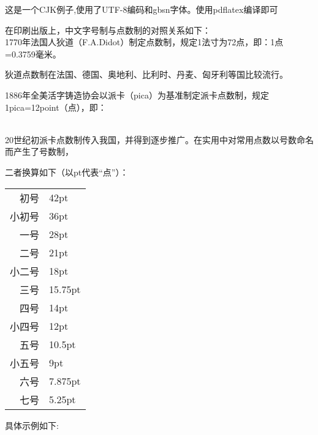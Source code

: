 \documentclass{article}
\newcommand{\chuhao}{\fontsize{42pt}{\baselineskip}\selectfont}
\newcommand{\xiaochuhao}{\fontsize{36pt}{\baselineskip}\selectfont}
\newcommand{\yihao}{\fontsize{28pt}{\baselineskip}\selectfont}
\newcommand{\erhao}{\fontsize{21pt}{\baselineskip}\selectfont}
\newcommand{\xiaoerhao}{\fontsize{18pt}{\baselineskip}\selectfont}
\newcommand{\sanhao}{\fontsize{15.75pt}{\baselineskip}\selectfont}
\newcommand{\sihao}{\fontsize{14pt}{\baselineskip}\selectfont}
\newcommand{\xiaosihao}{\fontsize{12pt}{\baselineskip}\selectfont}
\newcommand{\wuhao}{\fontsize{10.5pt}{\baselineskip}\selectfont}
\newcommand{\xiaowuhao}{\fontsize{9pt}{\baselineskip}\selectfont}
\newcommand{\liuhao}{\fontsize{7.875pt}{\baselineskip}\selectfont}
\newcommand{\qihao}{\fontsize{5.25pt}{\baselineskip}\selectfont}
\begin{document}
\begin{CJK}{UTF8}{gbsn}
这是一个CJK例子,使用了UTF-8编码和gbsn字体。使用pdflatex编译即可


在印刷出版上，中文字号制与点数制的对照关系如下：\\

 1770年法国人狄道（F.A.Didot）制定点数制，规定1法寸为72点，即：1点=0.3759毫米。

 狄道点数制在法国、德国、奥地利、比利时、丹麦、匈牙利等国比较流行。

 1886年全美活字铸造协会以派卡（pica）为基准制定派卡点数制，规定1pica=12point（点），即：

 \\

 20世纪初派卡点数制传入我国，并得到逐步推广。在实用中对常用点数以号数命名而产生了号数制，

 二者换算如下（以pt代表“点”）：\\

 \begin{center}

 \begin{tabular}{r@{\ =\ }l}

 初号& 42pt\\

 小初号& 36pt\\

 一号& 28pt\\

 二号& 21pt\\

 小二号& 18pt\\

 三号& 15.75pt\\

 四号& 14pt\\

 小四号& 12pt\\

 五号& 10.5pt\\

 小五号& 9pt\\

 六号 & 7.875pt\\

 七号 & 5.25pt

 \end{tabular}

 \end{center}


具体示例如下:
\\
\\
\chuhao{初号小苹果}\\
\xiaochuhao{小初号小苹果}\\
\yihao{一号小苹果}\\
\erhao{二号小苹果}\\
\xiaoerhao{小二号小苹果}\\
\sanhao{三号小苹果}\\
\sihao{四号小苹果}\\
\xiaosihao{小四号小苹果}\\
\wuhao{五号小苹果}\\
\xiaowuhao{小五号小苹果}\\
\liuhao{六号小苹果}\\
\qihao{七号小苹果}\\

\end{CJK}
\end{document}
